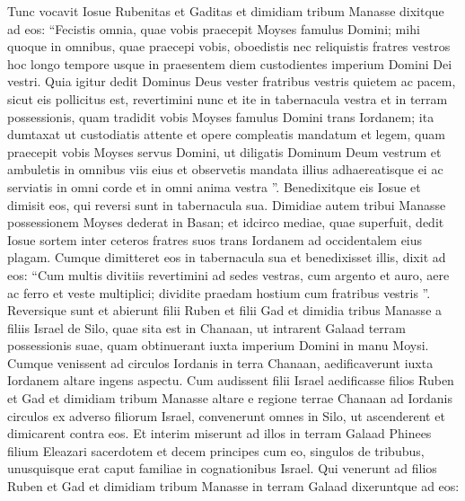 \begin{biblechapter}
\begin{biblechapter}
\begin{biblechapter}
\begin{biblechapter}
\begin{biblechapter}
\begin{biblechapter}
\begin{biblechapter}
\begin{biblechapter}
\begin{biblechapter}
\begin{biblechapter}
\begin{biblechapter}
\begin{biblechapter}
\begin{biblechapter}
\begin{biblechapter}
\begin{biblechapter}
\begin{biblechapter}
\begin{biblechapter}
\begin{biblechapter}
\begin{biblechapter}
\begin{biblechapter}
\begin{biblechapter}
\begin{biblechapter}
\verse Tunc vocavit Iosue Rubenitas et Gaditas et dimidiam tribum Manasse 
\verse dixitque ad eos: “Fecistis omnia, quae vobis praecepit Moyses famulus Domini; mihi quoque in omnibus, quae praecepi vobis, oboedistis 
\verse nec reliquistis fratres vestros hoc longo tempore usque in praesentem diem custodientes imperium Domini Dei vestri. 
\verse Quia igitur dedit Dominus Deus vester fratribus vestris quietem ac pacem, sicut eis pollicitus est, revertimini nunc et ite in tabernacula vestra et in terram possessionis, quam tradidit vobis Moyses famulus Domini trans Iordanem; 
\verse ita dumtaxat ut custodiatis attente et opere compleatis mandatum et legem, quam praecepit vobis Moyses servus Domini, ut diligatis Dominum Deum vestrum et ambuletis in omnibus viis eius et observetis mandata illius adhaereatisque ei ac serviatis in omni corde et in omni anima vestra ”. 
\verse Benedixitque eis Iosue et dimisit eos, qui reversi sunt in tabernacula sua. 
\verse Dimidiae autem tribui Manasse possessionem Moyses dederat in Basan; et idcirco mediae, quae superfuit, dedit Iosue sortem inter ceteros fratres suos trans Iordanem ad occidentalem eius plagam. Cumque dimitteret eos in tabernacula sua et benedixisset illis, 
\verse dixit ad eos: “Cum multis divitiis revertimini ad sedes vestras, cum argento et auro, aere ac ferro et veste multiplici; dividite praedam hostium cum fratribus vestris ”.
 \verse Reversique sunt et abierunt filii Ruben et filii Gad et dimidia tribus Manasse a filiis Israel de Silo, quae sita est in Chanaan, ut intrarent Galaad terram possessionis suae, quam obtinuerant iuxta imperium Domini in manu Moysi.
 \verse Cumque venissent ad circulos Iordanis in terra Chanaan, aedificaverunt iuxta Iordanem altare ingens aspectu. 
\verse Cum audissent filii Israel aedificasse filios Ruben et Gad et dimidiam tribum Manasse altare e regione terrae Chanaan ad Iordanis circulos ex adverso filiorum Israel, 
\verse convenerunt omnes in Silo, ut ascenderent et dimicarent contra eos.
 \verse Et interim miserunt ad illos in terram Galaad Phinees filium Eleazari sacerdotem 
\verse et decem principes cum eo, singulos de tribubus, unusquisque erat caput familiae in cognationibus Israel. 
\verse Qui venerunt ad filios Ruben et Gad et dimidiam tribum Manasse in terram Galaad dixeruntque ad eos: 

\end{biblechapter}
\end{biblechapter}
\end{biblechapter}
\end{biblechapter}
\end{biblechapter}
\end{biblechapter}
\end{biblechapter}
\end{biblechapter}
\end{biblechapter}
\end{biblechapter}
\end{biblechapter}
\end{biblechapter}
\end{biblechapter}
\end{biblechapter}
\end{biblechapter}
\end{biblechapter}
\end{biblechapter}
\end{biblechapter}
\end{biblechapter}
\end{biblechapter}
\end{biblechapter}
\end{biblechapter}
